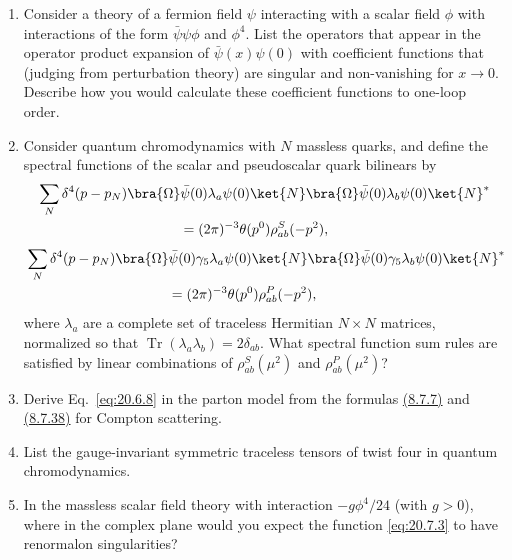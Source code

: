 

\begin{enumerate}
\item Consider a theory of a fermion field $\psi$ interacting with a scalar field $\phi$ with interactions of the form $\bar\psi\psi\phi$ and $\phi^4$. List the operators that appear in the operator product expansion of $\bar\psi(x)\psi(0)$ with coefficient functions that (judging from perturbation theory) are singular and non-vanishing for $x\to0$. Describe how you would calculate these coefficient functions to one-loop order.

\item Consider quantum chromodynamics with $N$ massless quarks, and define the spectral functions of the scalar and pseudoscalar quark bilinears by
\[
\begin{aligned}
&\sum_N\delta^4(p-p_N)
\bra{\Omega}\bar\psi(0)\lambda_a\psi(0)\ket{N}
\bra{\Omega}\bar\psi(0)\lambda_b\psi(0)\ket{N}^{*}
\\
&\hspace{36mm}
=(2\pi)^{-3}\theta(p^0)\rho_{ab}^{S}(-p^2),
\end{aligned}
\]
\[
\begin{aligned}
&\sum_N\delta^4(p-p_N)
\bra{\Omega}\bar\psi(0)\gamma_5\lambda_a\psi(0)\ket{N}
\bra{\Omega}\bar\psi(0)\gamma_5\lambda_b\psi(0)\ket{N}^{*}
\\
&\hspace{36mm}
=(2\pi)^{-3}\theta(p^0)\rho_{ab}^{P}(-p^2),
\end{aligned}
\]
where $\lambda_a$ are a complete set of traceless Hermitian $N\times N$ matrices, normalized so that $\operatorname{Tr}(\lambda_a\lambda_b)=2\delta_{ab}$. What spectral function sum rules are satisfied by linear combinations of $\rho_{ab}^{S}(\mu^2)$ and $\rho_{ab}^{P}(\mu^2)$?

\item Derive Eq.~\eqref{eq:20.6.8} in the parton model from the formulas \hyperref[eq:8.7.7]{(8.7.7)} and \hyperref[eq:8.7.38]{(8.7.38)} for Compton scattering.

\item List the gauge-invariant symmetric traceless tensors of twist four in quantum chromodynamics.

\item In the massless scalar field theory with interaction $-g\phi^4/24$ (with $g>0$), where in the complex plane would you expect the function \eqref{eq:20.7.3} to have renormalon singularities?
\end{enumerate}

